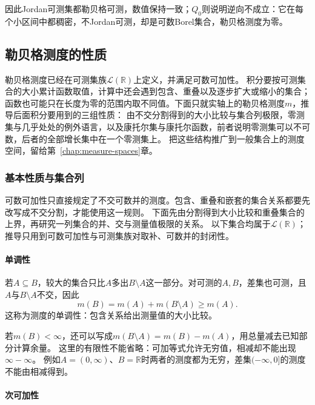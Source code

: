 因此Jordan可测集都勒贝格可测，数值保持一致；$Q_0$则说明逆向不成立：它在每个小区间中都稠密，不Jordan可测，却是可数Borel集合，勒贝格测度为零。

\subsection{勒贝格测度的性质}
\label{sec:comb-measurable-sets-and-weights}

勒贝格测度已经在可测集族$\mathcal L(\mathbb R)$上定义，并满足可数可加性。
积分要按可测集合的大小累计函数取值，计算中还会遇到包含、重叠以及逐步扩大或缩小的集合；
函数也可能只在长度为零的范围内取不同值。下面只就实轴上的勒贝格测度$m$，推导后面积分要用到的三组性质：
由不交分割得到的大小比较与集合列极限，零测集与几乎处处的例外语言，以及康托尔集与康托尔函数，前者说明零测集可以不可数，后者的全部增长集中在一个零测集上。
把这些结构推广到一般集合上的测度空间，留给第~\ref{chap:measure-spaces}章。

\subsubsection{基本性质与集合列}
\label{sec:comb-set-approximation}
\label{sec:analysis-set-measure-continuity}

可数可加性只直接规定了不交可数并的测度。包含、重叠和嵌套的集合关系都要先改写成不交分割，才能使用这一规则。
下面先由分割得到大小比较和重叠集合的上界，再研究一列集合的并、交与测量值极限的关系。
以下集合均属于$\mathcal L(\mathbb R)$；推导只用到可数可加性与可测集族对取补、可数并的封闭性。

\paragraph{单调性}

若$A\subseteq B$，较大的集合只比$A$多出$B\setminus A$这一部分。对可测的$A,B$，差集也可测，且$A$与$B\setminus A$不交，因此
\[
 m(B)=m(A)+m(B\setminus A)\geq m(A).
\]
这称为测度的单调性：包含关系给出测量值的大小比较。

若$m(B)<\infty$，还可以写成$m(B\setminus A)=m(B)-m(A)$，用总量减去已知部分计算余量。
这里的有限性不能省略：可加等式允许无穷值，相减却不能出现$\infty-\infty$。
例如$A=(0,\infty)$、$B=\mathbb R$时两者的测度都为无穷，差集$(-\infty,0]$的测度不能由相减得到。

\paragraph{次可加性}

